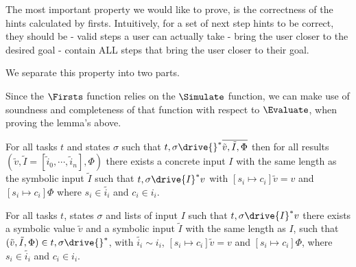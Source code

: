 The most important property we would like to prove, is the correctness of the hints calculated by firsts.
Intuitively, for a set of next step hints to be correct, they should be
- valid steps a user can actually take
- bring the user closer to the desired goal
- contain ALL steps that bring the user closer to their goal.

We separate this property into two parts.


\begin{lemma}
  \label{lem:soundfirsts}

\end{lemma}


\begin{lemma}
  \label{lem:completefirsts}

\end{lemma}


Since the $\Firsts$ function relies on the $\Simulate$ function, we can make use of soundness and completeness of that function with respect to $\Evaluate$, when proving the lemma's above.

\begin{lemma}
  \label{lem:soundsimulate}
  For all tasks $t$ and states $\sigma$
  such that $t,\sigma\drive{}^*\overline{\tilde{v},\tilde{I},\Phi}$
  then for all results $(\tilde{v},\tilde{I}=[\tilde{i}_0,\cdots,\tilde{i}_n],\Phi)$
  there exists a concrete input $I$ with the same length as the symbolic input $\tilde{I}$
  such that $t,\sigma\drive{I}^*v$
  with $[s_i\mapsto c_i]\tilde{v}=v$ and $[s_i\mapsto c_i]\Phi$
  where $s_i\in\tilde{i_i}$ and $c_i\in i_i$.
\end{lemma}

\begin{lemma}
  \label{lem:completesimulate}
  For all tasks $t$, states $\sigma$ and lists of input $I$
  such that $t,\sigma\drive{I}^*v$
  there exists a symbolic value $\tilde{v}$ and a symbolic input $\tilde{I}$ with the same length as $I$,
  such that $(\tilde{v},\tilde{I},\Phi)\in t,\sigma\drive{}^*$,
  with $\tilde{i_i}\sim i_i$, $[s_i\mapsto c_i]\tilde{v}=v$ and $[s_i\mapsto c_i]\Phi$,
  where $s_i\in\tilde{i_i}$ and $c_i\in i_i$.
\end{lemma}


